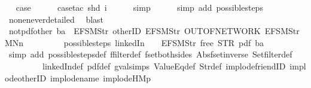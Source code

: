\begin{isabellebody}
\ \isamarkupfalse%
\ {\isacharquery}case\isanewline
\ \ \ \ \isamarkupfalse%
\ {\isacharparenleft}case{\isacharunderscore}tac\ {\isachardoublequoteopen}shd\ i{\isachardoublequoteclose}{\isacharparenright}\isanewline
\ \ \ \ \isamarkupfalse%
\ simp\isanewline
\ \ \ \ \isamarkupfalse%
\ {\isacharparenleft}simp\ add{\isacharcolon}\ possible{\isacharunderscore}steps{\isacharunderscore}{}{\isacharparenright}\isanewline
\ \ \ \ \isamarkupfalse%
\ none{\isacharunderscore}never{\isacharunderscore}detailed\ \isamarkupfalse%
\ blast\isanewline
{}\isamarkupfalse%
%
\endisatagproof
{\isafoldproof}%
%
\isadelimproof
\isanewline
%
\endisadelimproof
\isanewline
{}\isamarkupfalse%
\ not{\isacharunderscore}pdf{\isacharunderscore}other{\isacharcolon}\ {\isachardoublequoteopen}ba\ {\isasymnoteq}\ {\isacharbrackleft}EFSM{\isachardot}Str\ {\isacharprime}{\isacharprime}otherID{\isacharprime}{\isacharprime}{\isacharcomma}\ EFSM{\isachardot}Str\ {\isacharprime}{\isacharprime}OUT{\isacharunderscore}OF{\isacharunderscore}NETWORK{\isacharprime}{\isacharprime}{\isacharcomma}\ EFSM{\isachardot}Str\ {\isacharprime}{\isacharprime}MNn{}{\isacharprime}{\isacharprime}{\isacharbrackright}\ {\isasymLongrightarrow}\isanewline
\ \ \ \ \ \ \ \ possible{\isacharunderscore}steps\ linkedIn\ {}\ {\isacharless}{}\ {\isacharcolon}{\isacharequal}\ EFSM{\isachardot}Str\ {\isacharprime}{\isacharprime}free{\isacharprime}{\isacharprime}{\isachargreater}\ STR\ {\isacharprime}{\isacharprime}pdf{\isacharprime}{\isacharprime}\ ba\ {\isacharequal}\ {\isacharbraceleft}{\isacharbar}{\isacharbar}{\isacharbraceright}{\isachardoublequoteclose}\isanewline
%
\isadelimproof
\ \ %
\endisadelimproof
%
\isatagproof
{}\isamarkupfalse%
\ {\isacharparenleft}simp\ add{\isacharcolon}\ possible{\isacharunderscore}steps{\isacharunderscore}def\ ffilter{\isacharunderscore}def\ fset{\isacharunderscore}both{\isacharunderscore}sides\ Abs{\isacharunderscore}fset{\isacharunderscore}inverse\ Set{\isachardot}filter{\isacharunderscore}def\ \isanewline
\ \ \ \ \ \ \ \ \ linkedIn{\isacharunderscore}def\ pdf{}{\isacharunderscore}def\ gval{\isachardot}simps\ ValueEq{\isacharunderscore}def\ Str{\isacharunderscore}def\ implode{\isacharunderscore}friendID\ implode{\isacharunderscore}otherID\ implode{\isacharunderscore}name\ implode{\isacharunderscore}HM{}p{\isacharparenright}\isanewline
\ \ \isamarkupfalse%

\end{isabellebody}
